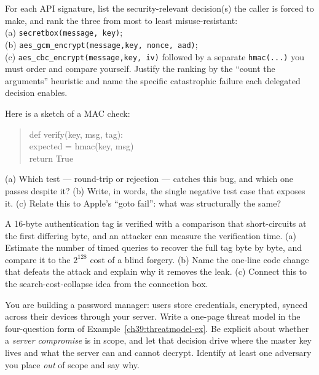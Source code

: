 \begin{exercise}
For each API signature, list the security-relevant decision(s) the caller is forced
to make, and rank the three from most to least misuse-resistant:\\
(a) \texttt{secretbox(message, key)};\\
(b) \texttt{aes\_gcm\_encrypt(message,}\allowbreak \texttt{key, nonce, aad)};\\
(c) \texttt{aes\_cbc\_encrypt(message,}\allowbreak \texttt{key, iv)} followed by a
separate \texttt{hmac(...)} you must order and compare yourself. Justify the ranking by the
``count the arguments'' heuristic and name the specific catastrophic failure each
delegated decision enables.
\end{exercise}

\begin{exercise}
Here is a sketch of a MAC check:
\begin{quote}\ttfamily
def verify(key, msg, tag):\\
\hspace*{2em}expected = hmac(key, msg)\\
\hspace*{2em}return True
\end{quote}
(a) Which test --- round-trip or rejection --- catches this bug, and which one
passes despite it? (b) Write, in words, the single negative test case that exposes
it. (c) Relate this to Apple's ``goto fail'': what was structurally the same?
\end{exercise}

\begin{exercise}
A 16-byte authentication tag is verified with a comparison that short-circuits at
the first differing byte, and an attacker can measure the verification time. (a)
Estimate the number of timed queries to recover the full tag byte by byte, and
compare it to the $2^{128}$ cost of a blind forgery. (b) Name the one-line code
change that defeats the attack and explain why it removes the leak. (c) Connect
this to the search-cost-collapse idea from the connection box.
\end{exercise}

\begin{exercise}
You are building a password manager: users store credentials, encrypted, synced
across their devices through your server. Write a one-page threat model in the
four-question form of Example~\ref{ch39:threatmodel-ex}. Be explicit about whether
a \emph{server compromise} is in scope, and let that decision drive where the
master key lives and what the server can and cannot decrypt. Identify at least one
adversary you place \emph{out} of scope and say why.
\end{exercise}

